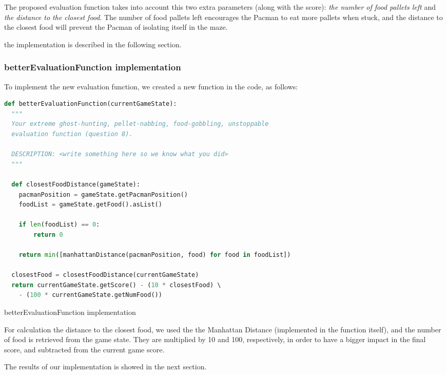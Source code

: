 \documentclass{article}
\begin{document}
The proposed evaluation function takes into account this two extra parameters (along with the score): \textit{the number of food pallets left} and \textit{the distance to the closest food}. The number of food pallets left encourages the Pacman to eat more pallets when stuck, and the distance to the closest food will prevent the Pacman of isolating itself in the maze.

the implementation is described in the following section.

\subsubsection{betterEvaluationFunction implementation}

To implement the new evaluation function, we created a new function in the code, as follows:

\begin{table}[!ht]
  \begin{lstlisting}[language=python, frame=tlbr, framesep=6pt, backgroundcolor=\color{light-gray}]
def betterEvaluationFunction(currentGameState):
  """
  Your extreme ghost-hunting, pellet-nabbing, food-gobbling, unstoppable
  evaluation function (question 8).

  DESCRIPTION: <write something here so we know what you did>
  """
  
  def closestFoodDistance(gameState):
    pacmanPosition = gameState.getPacmanPosition()
    foodList = gameState.getFood().asList()

    if len(foodList) == 0:
        return 0

    return min([manhattanDistance(pacmanPosition, food) for food in foodList])

  closestFood = closestFoodDistance(currentGameState)
  return currentGameState.getScore() - (10 * closestFood) \ 
    - (100 * currentGameState.getNumFood())
  \end{lstlisting}
  \caption{betterEvaluationFunction implementation}
\end{table}

For calculation the distance to the closest food, we used the the Manhattan Distance (implemented in the function itself), and the number of food is retrieved from the game state. They are multiplied by 10 and 100, respectively, in order to have a bigger impact in the final score, and subtracted from the current game score.

The results of our implementation is showed in the next section.
\end{document}
